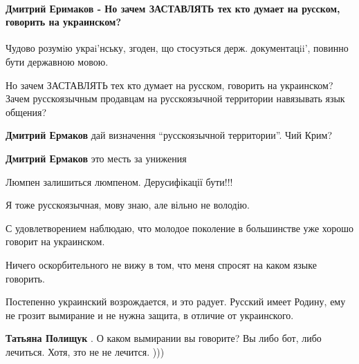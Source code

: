  
 
 
 
 
\paragraph{Дмитрий Еримаков - Но зачем ЗАСТАВЛЯТЬ тех кто думает на русском, говорить на украинском?}
\label{sec:18_06_2020.fb.zharkih_ekaterina.1.mova_jazyk.cmt.erimakov_prinuzhdenie}

\begin{itemize}
Чудово розумiю украi'нську, згоден, що стосуэться держ. документацii', повинно бути державною мовою.

Но зачем ЗАСТАВЛЯТЬ тех кто думает на русском, говорить на украинском? Зачем
русскоязычным продавцам на русскоязычной территории навязывать язык общения?


\textbf{Дмитрий Ермаков} дай визначення \enquote{русскоязычной территории}. Чий Крим?

\textbf{Дмитрий Ермаков} это месть за унижения

Люмпен залишиться люмпеном. Дерусифікації бути!!!


Я тоже русскоязычная, мову знаю, але вільно не володію.

С удовлетворением наблюдаю, что молодое поколение в большинстве уже хорошо
говорит на украинском.

Ничего оскорбительного не вижу в том, что меня спросят на каком языке говорить.

Постепенно украинский возрождается, и это радует. Русский имеет Родину, ему не
грозит вымирание и не нужна защита, в отличие от украинского.

\begin{itemize}
\textbf{Татьяна Полищук} . О каком вымирании вы говорите? Вы либо бот, либо лечиться. Хотя, зто не не лечится. )))


\end{itemize}
\end{itemize}
